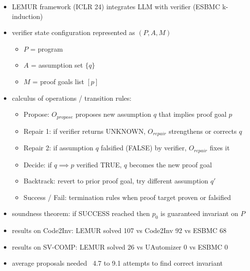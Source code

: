 \begin{itemize}
```
\item LEMUR framework (ICLR 24) integrates LLM with verifier (ESBMC k-induction)
\item verifier state configuration represented as $(P, A, M)$
\begin{itemize}
    \item $P$ = program
    \item $A$ = assumption set $\{q\}$
    \item $M$ = proof goals list $[p]$
\end{itemize}
\item calculus of operations / transition rules:
\begin{itemize}
    \item Propose: $O_{propose}$ proposes new assumption $q$ that implies proof goal $p$
    \item Repair 1: if verifier returns UNKNOWN, $O_{repair}$ strengthens or corrects $q$
    \item Repair 2: if assumption $q$ falsified (FALSE) by verifier, $O_{repair}$ fixes it
    \item Decide: if $q \implies p$ verified TRUE, $q$ becomes the new proof goal
    \item Backtrack: revert to prior proof goal, try different assumption $q'$
    \item Success / Fail: termination rules when proof target proven or falsified
\end{itemize}
\item soundness theorem: if SUCCESS reached then $p_0$ is guaranteed invariant on $P$
\item results on Code2Inv: LEMUR solved 107 vs Code2Inv 92 vs ESBMC 68
\item results on SV-COMP: LEMUR solved 26 vs UAutomizer 0 vs ESBMC 0
\item average proposals needed ~4.7 to 9.1 attempts to find correct invariant



\end{itemize}

